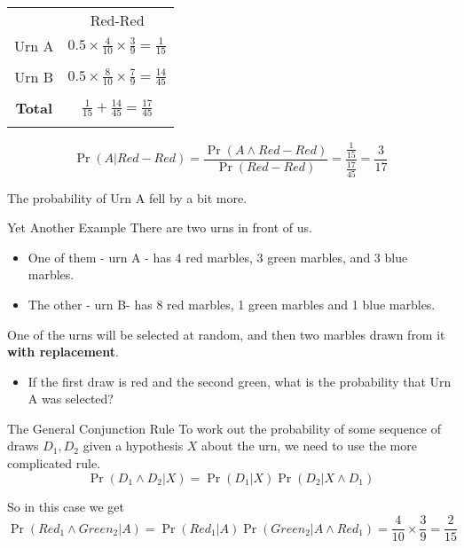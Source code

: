 \documentclass[
  ignorenonframetext,
]{beamer}
\providecommand{\tightlist}{%
  \setlength{\itemsep}{0pt}\setlength{\parskip}{0pt}}
\renewcommand{\,}{\text{, }}
\begin{document}
\begin{frame}
\begin{longtable}[]{@{}cc@{}}
\toprule
& Red-Red \\ \addlinespace
\midrule
\endhead
Urn A &
\(0.5 \times \frac{4}{10} \times \frac{3}{9} = \frac{1}{15}\) \\ \addlinespace
& \\ \addlinespace
Urn B &
\(0.5 \times \frac{8}{10} \times \frac{7}{9} = \frac{14}{45}\) \\ \addlinespace
& \\ \addlinespace
\textbf{Total} &
\(\frac{1}{15} + \frac{14}{45} = \frac{17}{45}\) \\ \addlinespace
\bottomrule
\end{longtable}

\pause

\[
\Pr(A | Red-Red) = \frac{\Pr(A \wedge Red-Red)}{\Pr(Red-Red)} = \frac{\frac{1}{15}}{\frac{17}{45}} = \frac{3}{17}
\]

\bigskip

The probability of Urn A fell by a bit more.
\end{frame}

\begin{frame}{Yet Another Example}
\protect\hypertarget{yet-another-example}{}
There are two urns in front of us.

\begin{itemize}
\tightlist
\item
  One of them - urn A - has 4 red marbles, 3 green marbles, and 3 blue
  marbles.
\item
  The other - urn B- has 8 red marbles, 1 green marbles and 1 blue
  marbles. \pause
\end{itemize}

One of the urns will be selected at random, and then two marbles drawn
from it \textbf{with replacement}.

\begin{itemize}
\tightlist
\item
  If the first draw is red and the second green, what is the probability
  that Urn A was selected?
\end{itemize}
\end{frame}

\begin{frame}{The General Conjunction Rule}
\protect\hypertarget{the-general-conjunction-rule}{}
To work out the probability of some sequence of draws \(D_1, D_2\) given
a hypothesis \(X\) about the urn, we need to use the more complicated
rule. \[
\Pr(D_1 \wedge D_2 | X) = \Pr(D_1 | X) \Pr(D_2 | X \wedge D_1)
\]

\pause

So in this case we get \[
\Pr(Red_1 \wedge Green_2 | A) = \Pr(Red_1 | A)\Pr(Green_2 | A \wedge Red_1) = \frac{4}{10} \times \frac{3}{9} = \frac{2}{15}
\]
\end{frame}
\end{document}
